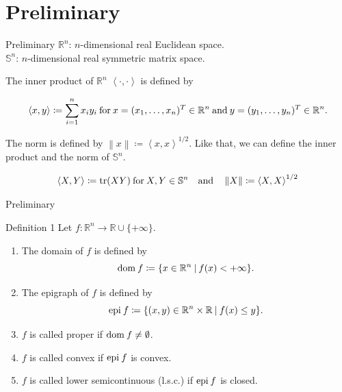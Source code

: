 \documentclass[aspectratio=169, dvipdfmx, 11pt]{beamer}
\newcommand{\RealNumberSet}{\mathbb{R}}
\newcommand{\NDemenstionalRealEuclideanSpace}{\mathbb{R}^n}
\newcommand{\NDemenstionalRealSymmetricMatrixSpace}{\mathbb{S}^n}
\newcommand{\Domain}[1]{\text{\rm dom\:${#1}$}} %
\newcommand{\Epigraph}[1]{\text{\rm epi\:${#1}$}} %
\newcommand{\Trace}[1]{\text{\rm tr$({#1})$}} %
\newcommand{\InnerProduct}[2]{\left\langle {#1},{#2}\right\rangle} %
\newcommand{\ExtendedRealValuedFunction}[2]{{#1}: {#2} \to \RealNumberSet \cup \{+\infty\}}
\newcommand{\SetForm}[2]{
  \{{#1}\:|\:{#2}\}
}
\begin{document}
\section{Preliminary}

\begin{frame}{Preliminary}
$\NDemenstionalRealEuclideanSpace$: $n$-dimensional real Euclidean space. \\
$\NDemenstionalRealSymmetricMatrixSpace$: $n$-dimensional real symmetric matrix space.

The inner product of $\NDemenstionalRealEuclideanSpace$ $\left\langle \cdot ,\cdot \right\rangle$  is defined by

  \begin{equation}
    \InnerProduct{x}{y} \coloneqq \sum_{i = 1}^{n} x_i y_i \:\text{for}\: x=(x_1,\dots,x_n)^T \in \mathbb{R}^n \:\text{and}\: y=(y_1,\dots,y_n)^T \in \mathbb{R}^n. \notag
  \end{equation}

The norm is defined by $\left\lVert x \right\rVert \coloneqq \InnerProduct{x}{x} ^{1/2} $. Like that, we can define the inner product and the norm of $\NDemenstionalRealSymmetricMatrixSpace$.

  \begin{equation}
    \InnerProduct{X}{Y} \coloneqq \Trace{XY} \:\text{for}\: X,Y \in \NDemenstionalRealSymmetricMatrixSpace \quad \text{and} \quad \left\lVert X \right\rVert \coloneqq \InnerProduct{X}{X} ^{1/2} \notag
  \end{equation}
\end{frame}

\begin{frame}{Preliminary}
  \begin{block}{Definition 1}
    Let $\ExtendedRealValuedFunction{f}{\NDemenstionalRealEuclideanSpace}$.
    \begin{enumerate}
      \item The domain of $f$ is defined by
      \begin{equation}
        \Domain{f} \coloneqq \SetForm{x \in \NDemenstionalRealEuclideanSpace}{f(x) < +\infty}. \notag
      \end{equation}
      \item The epigraph of $f$ is defined by
      \begin{equation}
        \Epigraph{f} \coloneqq \SetForm{(x,y) \in \NDemenstionalRealEuclideanSpace \times \RealNumberSet}{f(x) \leq y}. \notag
      \end{equation}
      \item $f$ is called proper if $\Domain{f} \neq \emptyset$.
      \item $f$ is called convex if $\Epigraph{f}$ is convex.
      \item $f$ is called lower semicontinuous (l.s.c.) if $\Epigraph{f}$ is closed.
    \end{enumerate}
  \end{block}
\end{frame}
\end{document}
